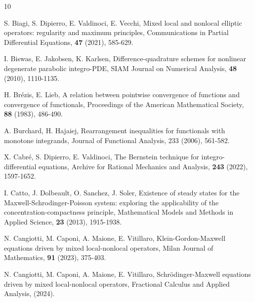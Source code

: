 \documentclass[12pt,a4paper,reqno]{amsart}
\numberwithin{equation}{section}
\begin{document}
\small
\begin{thebibliography}{10}




S. Biagi, S. Dipierro, E. Valdinoci, E. Vecchi,
{Mixed local and nonlocal elliptic operators: regularity and maximum principles},
Communications in Partial Differential Equations,
\textbf{47} (2021), 585-629.

I. Biswas, E. Jakobsen, K. Karlsen,
{Difference-quadrature schemes for nonlinear degenerate parabolic
integro-PDE},
SIAM Journal on Numerical Analysis,
\textbf{48} (2010), 1110-1135.




H. Br\'{e}zis, E. Lieb,
{A relation between pointwise convergence of functions and convergence of functionals},
Proceedings of the American Mathematical Society,
\textbf{88} (1983), 486-490.


A. Burchard, H. Hajaiej,
Rearrangement inequalities for functionals with monotone integrands,
Journal of Functional Analysis,
233 (2006), 561-582.


X. Cabr\'{e}, S. Dipierro, E. Valdinoci,
{The Bernstein technique for integro-differential equations},
Archive for Rational Mechanics and Analysis,
\textbf{243} (2022), 1597-1652.

I. Catto, J. Dolbeault, O. Sanchez, J. Soler,
{Existence of steady states for the Maxwell-Schrodinger-Poisson system: exploring the applicability of the concentration-compactness principle},
Mathematical Models and Methods in Applied Science,
\textbf{23} (2013), 1915-1938.




N. Cangiotti, M. Caponi, A. Maione, E. Vitillaro,
{Klein-Gordon-Maxwell equations driven by mixed local-nonlocal operators},
Milan Journal of Mathematics,
\textbf{91} (2023), 375-403.

N. Cangiotti, M. Caponi, A. Maione, E. Vitillaro,
{Schr\"{o}dinger-Maxwell equations driven by mixed local-nonlocal operators},
Fractional Calculus and Applied Analysis, (2024).




\end{thebibliography}
\end{document}
